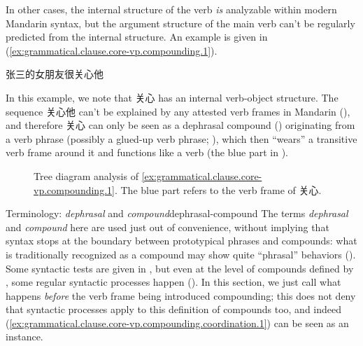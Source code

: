 \documentclass[UTF8, a4paper, oneside, scheme=plain, 12pt]{ctexrep}
\newcommand*{\citepages}[1]{pp.~{#1}}
\newcommand*{\term}[1]{\emph{#1}}
\begin{document}
In other cases, the internal structure of the verb \emph{is} analyzable within modern Mandarin syntax,
but the argument structure of the main verb can't
be regularly predicted from the internal structure.
An example is given in (\ref{ex:grammatical.clause.core-vp.compounding.1}).

\begin{exe}
    \ex\label{ex:grammatical.clause.core-vp.compounding.1} 张三的女朋友很关心他
\end{exe}

In this example, we note that 关心 has an internal verb-object structure.
The sequence 关心他 can't be explained by any attested verb frames in Mandarin
(),
and therefore 关心 can only be seen as a dephrasal compound ()
originating from a verb phrase
(possibly a glued-up verb phrase; ),
which then ``wears'' a transitive verb frame around it and functions like a verb
(the blue part in ).

\begin{figure}[H]
    {
        \centering
        \small
        
    }
    \caption{Tree diagram analysis of \eqref{ex:grammatical.clause.core-vp.compounding.1}.
    The blue part refers to the verb frame of 关心.}
    \label{fig:grammatical.clause.core-vp.compounding.1}
\end{figure}

\begin{theorybox}{Terminology: \term{dephrasal} and \term{compound}}{dephrasal-compound}
    The terms \term{dephrasal} and \term{compound} here are used just out of convenience,
    without implying that syntax stops at the boundary between prototypical phrases and compounds:
    what is traditionally recognized as a compound may show quite ``phrasal'' behaviors 
    ().
    Some syntactic tests are given in \citet[\citepages{448-451}]{cgel},
    but even at the level of compounds defined by \citeauthor{cgel},
    some regular syntactic processes happen ().
    In this section, we just call what happens \emph{before} the verb frame being introduced compounding;
    this does not deny that syntactic processes apply to this definition of compounds too,
    and indeed (\ref{ex:grammatical.clause.core-vp.compounding.coordination.1})
    can be seen as an instance.
\end{theorybox}
\end{document}
